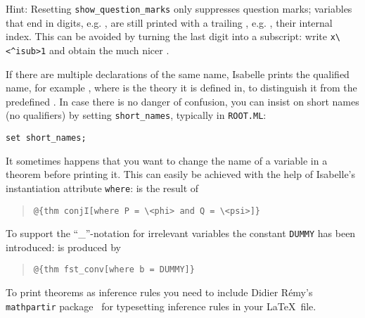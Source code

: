 \begin{isabellebody}
\begin{isamarkuptext}
Hint: Resetting \verb!show_question_marks! only suppresses question
marks; variables that end in digits, e.g. , are still
printed with a trailing , e.g. , their
internal index. This can be avoided by turning the last digit into a
subscript: write \verb!x\<^isub>1! and obtain the much nicer .%
\end{isamarkuptext}%
\isamarkuptrue%
%
\isadelimML
%
\endisadelimML
%
\isatagML
%
\endisatagML
{\isafoldML}%
%
\isadelimML
%
\endisadelimML
%
\isamarkuptrue%
%
\begin{isamarkuptext}%
If there are multiple declarations of the same name, Isabelle prints
the qualified name, for example , where  is the
theory it is defined in, to distinguish it from the predefined . In case there is no danger of confusion, you can insist on
short names (no qualifiers) by setting \verb!short_names!, typically
in \texttt{ROOT.ML}:
\begin{verbatim}
set short_names;
\end{verbatim}%
\end{isamarkuptext}%
\isamarkuptrue%
%
\isamarkuptrue%
%
\begin{isamarkuptext}%
It sometimes happens that you want to change the name of a
variable in a theorem before printing it. This can easily be achieved
with the help of Isabelle's instantiation attribute \texttt{where}:
\isa{{\isasymlbrakk}{\isasymphi}{\isacharsemicolon}\ {\isasympsi}{\isasymrbrakk}\ {\isasymLongrightarrow}\ {\isasymphi}\ {\isasymand}\ {\isasympsi}} is the result of
\begin{quote}
\verb!@!\verb!{thm conjI[where P = \<phi> and Q = \<psi>]}!
\end{quote}
To support the ``\_''-notation for irrelevant variables
the constant \texttt{DUMMY} has been introduced:
 is produced by
\begin{quote}
\verb!@!\verb!{thm fst_conv[where b = DUMMY]}!
\end{quote}%
\end{isamarkuptext}%
\isamarkuptrue%
%
\isamarkuptrue%
%
\begin{isamarkuptext}%
To print theorems as inference rules you need to include Didier
R\'emy's \texttt{mathpartir} package~\cite{mathpartir}
for typesetting inference rules in your \LaTeX\ file.


\end{isamarkuptext}
\end{isabellebody}
